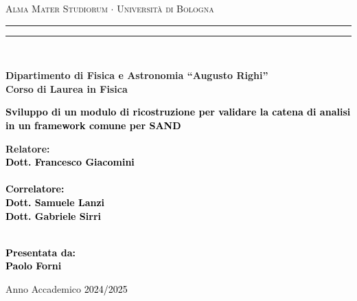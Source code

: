 \documentclass[main.tex]{subfiles}
\begin{document}
\begin{titlepage}
  \begin{center}
    {{\Large
    {\textsc{Alma Mater Studiorum $\cdot$ Universit\`a di Bologna}}
    }}
    \rule[0.1cm]{15.8cm}{0.1mm}
    \rule[0.5cm]{15.8cm}{0.6mm}
    \\\vspace{3mm}

    {\small
    {\bf Dipartimento di Fisica e Astronomia “Augusto Righi”\\
    Corso di Laurea in Fisica
    }
    }

  \end{center}

  \vspace{23mm}

  \begin{center}
    \textcolor{black}{
        {\LARGE
      {\bf
      Sviluppo di un modulo di ricostruzione per validare la catena
      di analisi in un framework comune per SAND\\
      }
      }
    }
  \end{center}

  \vspace{50mm} \par \noindent

  \begin{minipage}[t]{0.47\textwidth}

    {\large
    {\bf
    Relatore: \vspace{2mm}\\
    \textcolor{black}{Dott. Francesco Giacomini}\\\\

    \textcolor{black}{
      \bf Correlatore:
      \vspace{2mm}\\
      Dott. Samuele Lanzi \\
      Dott. Gabriele Sirri\\\\
    }
    }
    }
  \end{minipage}
%
  \hfill
%
  \begin{minipage}[t]{0.47\textwidth}
    \raggedleft
    \textcolor{black}{
        {\large{\bf Presentata da:
      \vspace{2mm}\\
      Paolo Forni}}
    }
  \end{minipage}

  \vfill

  \begin{center}
    Anno Accademico \textcolor{black}{2024/2025}
  \end{center}

  \vspace*{0cm}


\end{titlepage}
\end{document}
